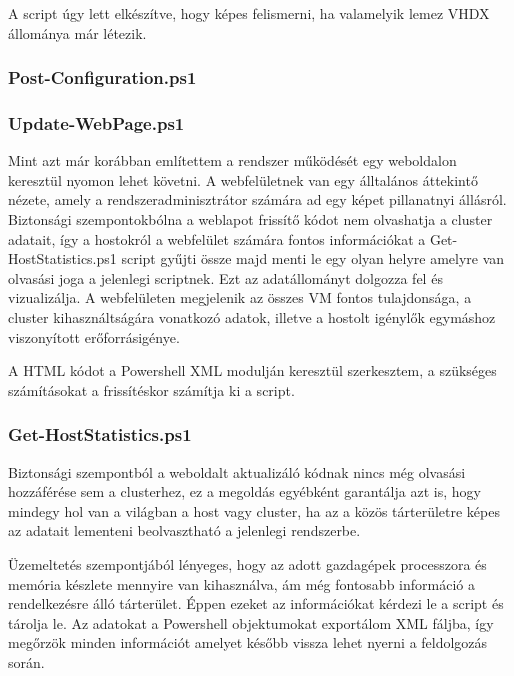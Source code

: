 \documentclass[12pt,oneside,justify,table]{book}
\begin{document}
A script úgy lett elkészítve, hogy képes felismerni, ha valamelyik lemez VHDX állománya már létezik.






\subsubsection{Post-Configuration.ps1}

\subsubsection{Update-WebPage.ps1}
Mint azt már korábban említettem a rendszer működését egy weboldalon keresztül nyomon lehet követni. A webfelületnek van egy álltalános áttekintő nézete, amely a rendszeradminisztrátor számára ad egy képet pillanatnyi állásról. 
Biztonsági szempontokbólna a weblapot frissítő kódot nem olvashatja a cluster adatait, így a hostokról a webfelület számára fontos információkat a Get-HostStatistics.ps1 script gyűjti össze majd menti le egy olyan helyre amelyre van olvasási joga a jelenlegi scriptnek. Ezt az adatállományt dolgozza fel és vizualizálja. A webfelületen megjelenik az összes VM fontos tulajdonsága, a cluster kihasználtságára vonatkozó adatok, illetve a hostolt igénylők egymáshoz viszonyított erőforrásigénye.

A HTML kódot a Powershell XML modulján keresztül szerkesztem, a szükséges számításokat a frissítéskor számítja ki a script.

\subsubsection{Get-HostStatistics.ps1}
Biztonsági szempontból a weboldalt aktualizáló kódnak nincs még olvasási hozzáférése sem a clusterhez, ez a megoldás egyébként garantálja azt is, hogy mindegy hol van a világban a host vagy cluster, ha az a közös tárterületre képes az adatait lementeni beolvasztható a jelenlegi rendszerbe. 

Üzemeltetés szempontjából lényeges, hogy az adott gazdagépek processzora és memória készlete mennyire van kihasználva, ám még fontosabb információ a rendelkezésre álló tárterület. Éppen ezeket az információkat kérdezi le a script és tárolja le. Az adatokat a Powershell objektumokat exportálom XML fáljba, így megőrzök minden információt amelyet később vissza lehet nyerni a feldolgozás során.
\end{document}
